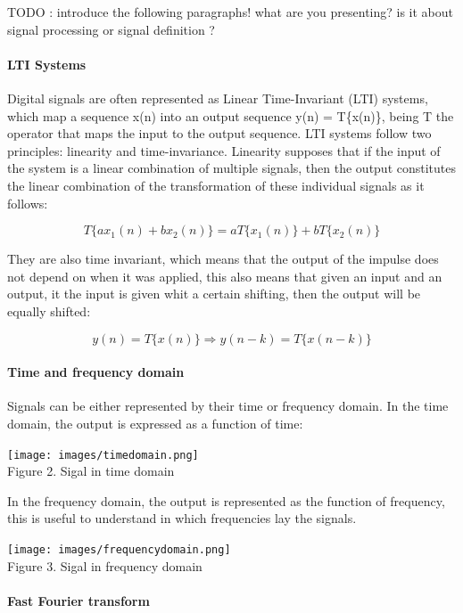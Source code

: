 \bigskip
{\color{red} TODO : introduce the following paragraphs! what are you presenting? is it about signal processing or signal definition ? }

\paragraph{LTI Systems}
Digital signals are often represented as Linear Time-Invariant (LTI) systems, which map a sequence x(n) into an output sequence y(n) = T\{x(n)\}, being T{} the operator that maps the input to the output sequence. LTI systems follow two principles: linearity and time-invariance. Linearity supposes that if the input of the system is a linear combination of multiple signals, then the output constitutes the linear combination of the transformation of these individual signals as it follows:


$$T\{ax_1(n) + bx_2(n)\} = aT\{x_1(n)\} + bT\{x_2(n)\}$$

They are also time invariant, which means that the output of the impulse does not depend on when it was applied, this also means  that given an input and an output, it  the input is given whit a certain shifting, then the output will be equally shifted:

$$y(n) = T\{x(n)\} \Rightarrow y(n - k) = T\{x(n - k)\}
$$

\paragraph{Time and frequency domain}
Signals can be either represented by their time or frequency domain. In the time domain, the output is expressed as a function of time:

\begin{center}
\texttt{[image: images/timedomain.png]}\\
Figure 2. Sigal in time domain
\end{center}

In the frequency domain, the output is represented as the function of frequency, this is useful to understand in which frequencies lay the signals.

\begin{center}
\texttt{[image: images/frequencydomain.png]}\\
Figure 3. Sigal in frequency domain
\end{center}


\paragraph{Fast Fourier transform}

